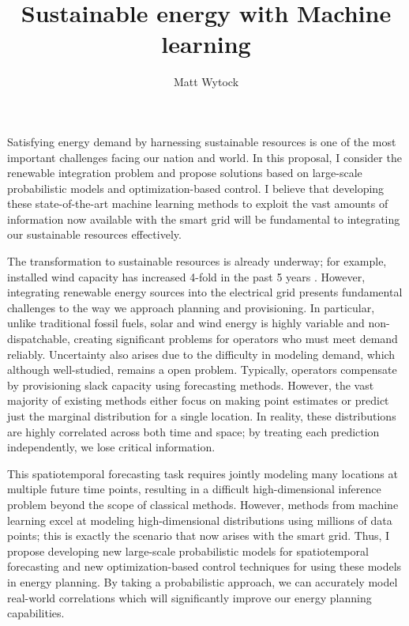 \documentclass[12pt]{article}
\title{Sustainable energy with Machine learning}
\author{Matt Wytock}
\begin{document}
Satisfying energy demand by harnessing sustainable resources is one of the most important challenges facing our nation and world. In this proposal, I consider the renewable integration problem and propose solutions based on large-scale probabilistic models and optimization-based control. I believe that developing these state-of-the-art machine learning methods to exploit the vast amounts of information now available with the smart grid will be fundamental to integrating our sustainable resources effectively.

The transformation to sustainable resources is already underway; for example, installed wind capacity has increased 4-fold in the past 5 years \cite{doe.12}. However, integrating renewable energy sources into the electrical grid presents fundamental challenges to the way we approach planning and provisioning. In particular, unlike traditional fossil fuels, solar and wind energy is highly variable and non-dispatchable, creating significant problems for operators who must meet demand reliably. Uncertainty also arises due to the difficulty in modeling demand, which although well-studied, remains a open problem. Typically, operators compensate by provisioning slack capacity using forecasting methods. However, the vast majority of existing methods either focus on making point estimates or predict just the marginal distribution for a single location. In reality, these distributions are highly correlated across both time and space; by treating each prediction independently, we lose critical information.

This spatiotemporal forecasting task requires jointly modeling many locations at multiple future time points, resulting in a difficult high-dimensional inference problem beyond the scope of classical methods. However, methods from machine learning excel at modeling high-dimensional distributions using millions of data points; this is exactly the scenario that now arises with the smart grid. Thus, I propose developing new large-scale probabilistic models for spatiotemporal forecasting and new optimization-based control techniques for using these models in energy planning. By taking a probabilistic approach, we can accurately model real-world correlations which will significantly improve our energy planning capabilities.
\end{document}
